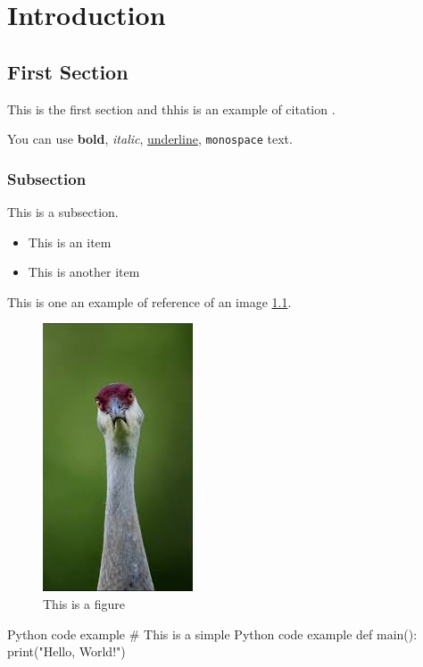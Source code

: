 \chapter{Introduction}

\section{First Section}

This is the first section and thhis is an example of citation \cite{example}. 

You can use \textbf{bold}, \textit{italic}, \underline{underline}, \texttt{monospace} text.

\subsection{Subsection}

This is a subsection.

\begin{itemize}
    \item This is an item
    \item This is another item
\end{itemize}

This is one an example of reference of an image \cref{fig:example}.

\begin{figure}[H]
    \centering
    \includegraphics[scale = 0.6]{../src/assets/image.jpg}
    \captionsetup{justification=centering}
    \caption{This is a figure} \label{fig:example}
\end{figure}

\begin{codelisting}[language=Python]{Python code example}
# This is a simple Python code example
def main():
    print("Hello, World!")
\end{codelisting}